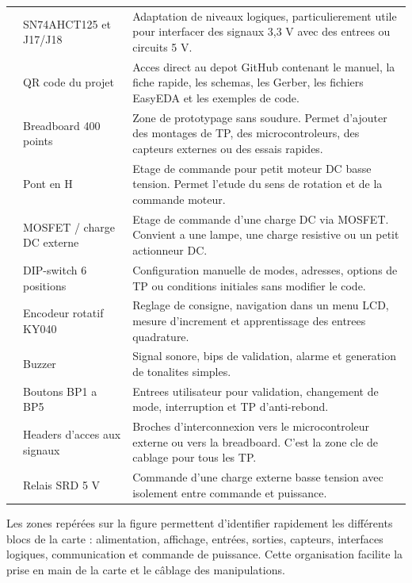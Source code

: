 \documentclass[11pt,a4paper]{article}
\begin{document}
\begin{center}
{\begin{longtable}{@{}>{\centering\arraybackslash}p{0.9cm}>{\RaggedRight\arraybackslash}p{4.0cm}>{\RaggedRight\arraybackslash}p{11.0cm}@{}}
12 & SN74AHCT125 et J17/J18 & Adaptation de niveaux logiques, particulierement utile pour interfacer des signaux 3,3 V avec des entrees ou circuits 5 V. \\
13 & QR code du projet & Acces direct au depot GitHub contenant le manuel, la fiche rapide, les schemas, les Gerber, les fichiers EasyEDA et les exemples de code. \\
14 & Breadboard 400 points & Zone de prototypage sans soudure. Permet d'ajouter des montages de TP, des microcontroleurs, des capteurs externes ou des essais rapides. \\
15 & Pont en H & Etage de commande pour petit moteur DC basse tension. Permet l'etude du sens de rotation et de la commande moteur. \\
16 & MOSFET / charge DC externe & Etage de commande d'une charge DC via MOSFET. Convient a une lampe, une charge resistive ou un petit actionneur DC. \\
17 & DIP-switch 6 positions & Configuration manuelle de modes, adresses, options de TP ou conditions initiales sans modifier le code. \\
18 & Encodeur rotatif KY040 & Reglage de consigne, navigation dans un menu LCD, mesure d'increment et apprentissage des entrees quadrature. \\
19 & Buzzer & Signal sonore, bips de validation, alarme et generation de tonalites simples. \\
20 & Boutons BP1 a BP5 & Entrees utilisateur pour validation, changement de mode, interruption et TP d'anti-rebond. \\
21 & Headers d'acces aux signaux & Broches d'interconnexion vers le microcontroleur externe ou vers la breadboard. C'est la zone cle de cablage pour tous les TP. \\
22 & Relais SRD 5 V & Commande d'une charge externe basse tension avec isolement entre commande et puissance. \\
\bottomrule
\end{longtable}}
\end{center}

\begin{tipbox}
Les zones repérées sur la figure permettent d’identifier rapidement les différents blocs de la carte : alimentation, affichage, entrées, sorties, capteurs, interfaces logiques, communication et commande de puissance. Cette organisation facilite la prise en main de la carte et le câblage des manipulations.
\end{tipbox}
\end{document}
